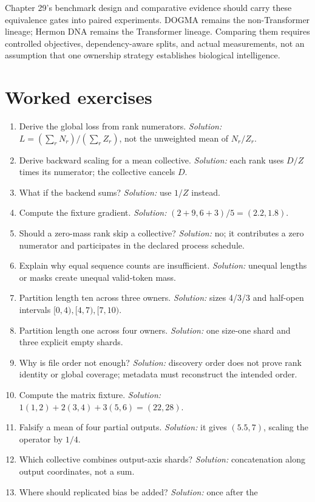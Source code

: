 Chapter 29's benchmark design and comparative evidence should carry these
equivalence gates into paired experiments. DOGMA remains the non-Transformer
lineage; Hermon DNA remains the Transformer lineage. Comparing them requires
controlled objectives, dependency-aware splits, and actual measurements, not an
assumption that one ownership strategy establishes biological intelligence.

\section{Worked exercises}
\begin{enumerate}
\item Derive the global loss from rank numerators. \emph{Solution:}
$L=(\sum_rN_r)/(\sum_rZ_r)$, not the unweighted mean of $N_r/Z_r$.
\item Derive backward scaling for a mean collective. \emph{Solution:}
each rank uses $D/Z$ times its numerator; the collective cancels $D$.
\item What if the backend sums? \emph{Solution:} use $1/Z$ instead.
\item Compute the fixture gradient. \emph{Solution:} $(2+9,6+3)/5=(2.2,1.8)$.
\item Should a zero-mass rank skip a collective? \emph{Solution:} no;
it contributes a zero numerator and participates in the declared process schedule.
\item Explain why equal sequence counts are insufficient. \emph{Solution:}
unequal lengths or masks create unequal valid-token mass.
\item Partition length ten across three owners. \emph{Solution:}
sizes 4/3/3 and half-open intervals $[0,4),[4,7),[7,10)$.
\item Partition length one across four owners. \emph{Solution:}
one size-one shard and three explicit empty shards.
\item Why is file order not enough? \emph{Solution:} discovery order does not prove
rank identity or global coverage; metadata must reconstruct the intended order.
\item Compute the matrix fixture. \emph{Solution:}
$1(1,2)+2(3,4)+3(5,6)=(22,28)$.
\item Falsify a mean of four partial outputs. \emph{Solution:}
it gives $(5.5,7)$, scaling the operator by $1/4$.
\item Which collective combines output-axis shards? \emph{Solution:}
concatenation along output coordinates, not a sum.
\item Where should replicated bias be added? \emph{Solution:} once after the

\end{enumerate}
